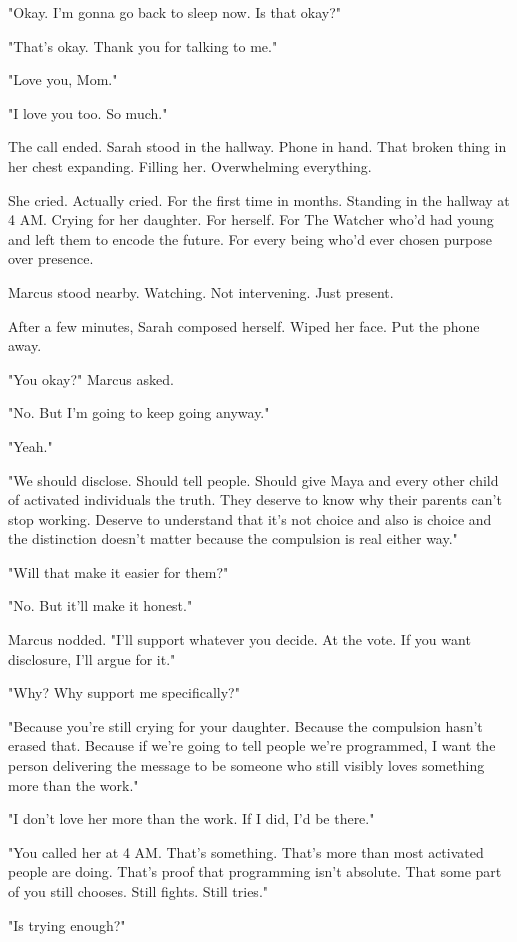 "Okay. I'm gonna go back to sleep now. Is that okay?"

"That's okay. Thank you for talking to me."

"Love you, Mom."

"I love you too. So much."

The call ended. Sarah stood in the hallway. Phone in hand. That broken thing in her chest expanding. Filling her. Overwhelming everything.

She cried. Actually cried. For the first time in months. Standing in the hallway at 4 AM. Crying for her daughter. For herself. For The Watcher who'd had young and left them to encode the future. For every being who'd ever chosen purpose over presence.

Marcus stood nearby. Watching. Not intervening. Just present.

After a few minutes, Sarah composed herself. Wiped her face. Put the phone away.

"You okay?" Marcus asked.

"No. But I'm going to keep going anyway."

"Yeah."

"We should disclose. Should tell people. Should give Maya and every other child of activated individuals the truth. They deserve to know why their parents can't stop working. Deserve to understand that it's not choice and also is choice and the distinction doesn't matter because the compulsion is real either way."

"Will that make it easier for them?"

"No. But it'll make it honest."

Marcus nodded. "I'll support whatever you decide. At the vote. If you want disclosure, I'll argue for it."

"Why? Why support me specifically?"

"Because you're still crying for your daughter. Because the compulsion hasn't erased that. Because if we're going to tell people we're programmed, I want the person delivering the message to be someone who still visibly loves something more than the work."

"I don't love her more than the work. If I did, I'd be there."

"You called her at 4 AM. That's something. That's more than most activated people are doing. That's proof that programming isn't absolute. That some part of you still chooses. Still fights. Still tries."

"Is trying enough?"


